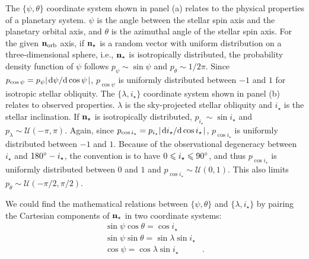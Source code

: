 \documentclass[twocolumn,times]{aastex631}
\begin{document}
The $\{\psi, \theta\}$ coordinate system shown in panel (a) relates to the physical properties of a planetary system. $\psi$ is the angle between the stellar spin axis and the planetary orbital axis, and $\theta$ is the azimuthal angle of the stellar spin axis. For the given $\bf{n}_{\rm orb}$ axis, if $\bf{n}_{\star}$ is a random vector with uniform distribution on a three-dimensional sphere, i.e., $\bf{n}_{\star}$ is isotropically distributed, the probability density function of $\psi$ follows $p_{\psi} \sim \sin{\psi}$ and $p_\theta \sim 1/2\pi$. Since $p_{\cos{\psi}} = p_{\psi} \abs{\dv*{\psi}{\cos{\psi}}}$, $p_{\cos{\psi}}$ is uniformly distributed between $-1$ and $1$ for isotropic stellar obliquity.
The $\{\lambda, i_\star\}$ coordinate system shown in panel (b) relates to observed properties. $\lambda$ is the sky-projected stellar obliquity and $i_\star$ is the stellar inclination. If $\bf{n}_{\star}$ is isotropically distributed, $p_{i_\star} \sim \sin{i_\star}$ and $p_\lambda \sim \mathcal{U}(-\pi, \pi)$. Again, since $p_{\cos{i_\star}} = p_{i_\star} \abs{\dv*{i_\star}{\cos{i_\star}}}$, $p_{\cos{i_\star}}$ is uniformly distributed between $-1$ and $1$. 
Because of the observational degeneracy between $i_\star$ and $180\mbox{$^\circ$} - i_\star$, the convention is to have $0 \leqslant i_\star \leqslant 90\mbox{$^\circ$}$, and thus $p_{\cos{i_\star}}$ is uniformly distributed between $0$ and $1$ and $p_{\cos{i_\star}} \sim \mathcal{U}(0, 1)$. This also limits $p_\theta \sim \mathcal{U}(-\pi/2, \pi/2)$.

We could find the mathematical relations between $\{\psi, \theta\}$ and $\{\lambda, i_\star\}$ by pairing the Cartesian components of $\bf{n}_{\star}$ in two coordinate systems:
\begin{align}
    \sin{\psi}\cos{\theta} = \cos{i_\star}& \label{eq:coord1}\\
    \sin{\psi}\sin{\theta} = \sin{\lambda}\sin{i_\star}& \label{eq:coord2}\\
    \cos{\psi} = \cos{\lambda}\sin{i_\star} \label{eq:coord3}&.
\end{align}
\end{document}
